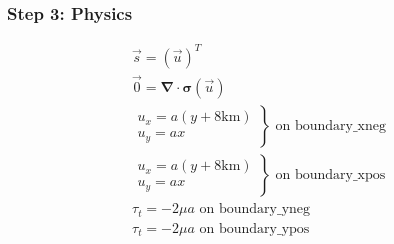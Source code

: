 \documentclass[aspectratio=169]{beamer}
\begin{document}
\begin{frame}[t]
  \frametitle{Step 3: Physics}
  \summary{}

  \begin{minipage}{0.35\textwidth}
    {\scriptsize
    \begin{gather*}
      \vec{s} = \left( \vec{u} \right)^T \\
      \vec{0} = \boldsymbol{\nabla} \cdot \boldsymbol{\sigma}(\vec{u}) \\
      \left. \begin{array}{c} u_x = a(y+8\mathrm{km}) \\ u_y = ax \end{array}\right\} \text{ on boundary\_xneg} \\
      \left. \begin{array}{c} u_x = a(y+8\mathrm{km}) \\ u_y = ax \end{array}\right\} \text{ on boundary\_xpos} \\
      \tau_t = -2\mu a \text{ on boundary\_yneg} \\
      \tau_t = -2\mu a \text{ on boundary\_ypos}
    \end{gather*}}
  \end{minipage}
  \hfill
  \begin{minipage}{0.55\textwidth}
  \end{minipage}
      
\end{frame}
\end{document}
